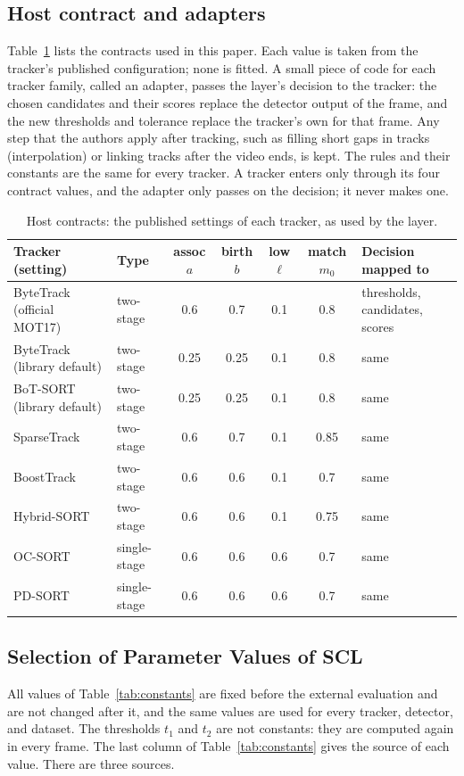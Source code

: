 \documentclass[pdflatex,sn-mathphys-num,iicol]{sn-jnl}
\begin{document}
\subsection{Host contract and adapters}\label{sec:contract}
Table~\ref{tab:contracts} lists the contracts used in this paper. Each value
is taken from the tracker's published configuration; none is fitted. A small
piece of code for each tracker family, called an adapter, passes the layer's
decision to the tracker:
the chosen candidates and their scores replace the detector output of the
frame, and the new thresholds and tolerance replace the tracker's own for
that frame. Any step that the authors apply after tracking, such as
filling short gaps in tracks (interpolation) or linking tracks after the video
ends, is kept. The rules and their constants are
the same for every tracker. A tracker enters only through its four contract
values, and the adapter only passes on the decision; it never makes one.

\begin{table}[t]
\caption{Host contracts: the published settings of each tracker, as used by
the layer.}
\label{tab:contracts}
\centering\footnotesize
\setlength{\tabcolsep}{4pt}
\begin{tabular}{@{}>{\raggedright\arraybackslash}p{30mm}lcccc>{\raggedright\arraybackslash}p{32mm}@{}}
\toprule
Tracker (setting) & Type & assoc $a$ & birth $b$ & low $\ell$ & match $m_0$ & Decision mapped to\\
\midrule
ByteTrack (official MOT17) & two-stage & 0.6 & 0.7 & 0.1 & 0.8 & thresholds, candidates, scores\\
ByteTrack (library default) & two-stage & 0.25 & 0.25 & 0.1 & 0.8 & same\\
BoT-SORT (library default) & two-stage & 0.25 & 0.25 & 0.1 & 0.8 & same\\
SparseTrack & two-stage & 0.6 & 0.7 & 0.1 & 0.85 & same\\
BoostTrack & two-stage & 0.6 & 0.6 & 0.1 & 0.7 & same\\
Hybrid-SORT & two-stage & 0.6 & 0.6 & 0.1 & 0.75 & same\\
OC-SORT & single-stage & 0.6 & 0.6 & 0.6 & 0.7 & same\\
PD-SORT & single-stage & 0.6 & 0.6 & 0.6 & 0.7 & same\\
\bottomrule
\end{tabular}
\end{table}

\subsection{Selection of Parameter Values of SCL}\label{sec:constants}
All values of Table~\ref{tab:constants} are fixed before the external evaluation and are not
changed after it, and the same values are used for every tracker, detector, and dataset. The
thresholds $t_1$ and $t_2$ are not constants: they are computed again in every frame. The last
column of Table~\ref{tab:constants} gives the source of each value. There are three sources.
\end{document}
